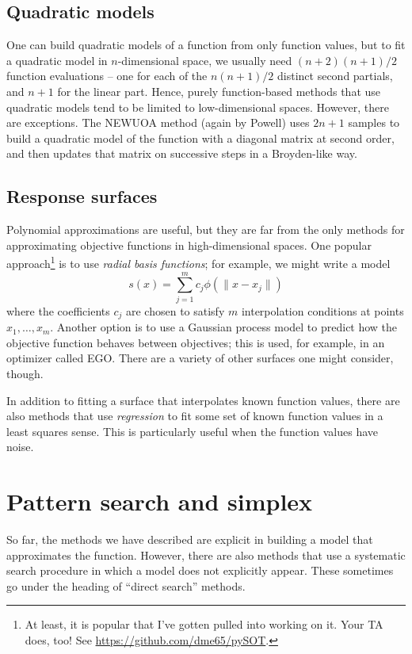 \documentclass[12pt, leqno]{article} %
\begin{document}
\subsection*{Quadratic models}

One can build quadratic models of a function from only function
values, but to fit a quadratic model in $n$-dimensional space, we
usually need $(n+2)(n+1)/2$ function evaluations -- one for each of
the $n(n+1)/2$ distinct second partials, and $n+1$ for the linear
part.  Hence, purely function-based methods that use quadratic models
tend to be limited to low-dimensional spaces.  However, there are
exceptions.  The NEWUOA method (again by Powell) uses $2n+1$ samples
to build a quadratic model of the function with a diagonal matrix at
second order, and then updates that matrix on successive steps in a
Broyden-like way.

\subsection*{Response surfaces}

Polynomial approximations are useful, but they are far from the only
methods for approximating objective functions in high-dimensional
spaces.  One popular approach\footnote{%
At least, it is popular that I've gotten pulled into working on it.
Your TA does, too!  See \url{https://github.com/dme65/pySOT}.  
} is to use {\em radial basis functions};
for example, we might write a model
\[
  s(x) = \sum_{j=1}^m c_j \phi(\|x-x_j\|)
\]
where the coefficients $c_j$ are chosen to satisfy $m$ interpolation
conditions at points $x_1, \ldots, x_m$.  Another option is to use
a Gaussian process model to predict how the objective function behaves
between objectives; this is used, for example, in an optimizer called
EGO.  There are a variety of other surfaces one might consider, though.

In addition to fitting a surface that interpolates known function
values, there are also methods that use {\em regression} to fit
some set of known function values in a least squares sense.
This is particularly useful when the function values have noise.

\section*{Pattern search and simplex}

So far, the methods we have described are explicit in building a model
that approximates the function.  However, there are also methods that
use a systematic search procedure in which a model does not explicitly
appear.  These sometimes go under the heading of ``direct search''
methods.
\end{document}
